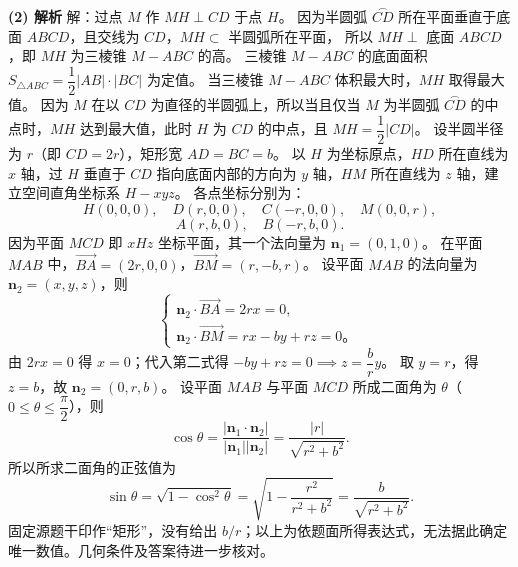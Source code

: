 \begin{answer}
\textbf{(2) 解析} 解：过点 $M$ 作 $MH \perp CD$ 于点 $H$。
因为半圆弧 $\overset{\frown}{CD}$ 所在平面垂直于底面 $ABCD$，且交线为 $CD$，$MH \subset$ 半圆弧所在平面，
所以 $MH \perp$ 底面 $ABCD$，即 $MH$ 为三棱锥 $M - ABC$ 的高。
三棱锥 $M - ABC$ 的底面面积 $S_{\triangle ABC} = \dfrac12 |AB| \cdot |BC|$ 为定值。
当三棱锥 $M - ABC$ 体积最大时，$MH$ 取得最大值。
因为 $M$ 在以 $CD$ 为直径的半圆弧上，所以当且仅当 $M$ 为半圆弧 $\overset{\frown}{CD}$ 的中点时，$MH$ 达到最大值，此时 $H$ 为 $CD$ 的中点，且 $MH = \dfrac12 |CD|$。
设半圆半径为 $r$（即 $CD = 2r$），矩形宽 $AD = BC = b$。
以 $H$ 为坐标原点，$HD$ 所在直线为 $x$ 轴，过 $H$ 垂直于 $CD$ 指向底面内部的方向为 $y$ 轴，$HM$ 所在直线为 $z$ 轴，建立空间直角坐标系 $H - xyz$。
各点坐标分别为：
\nopagebreak[4]
\[H(0, 0, 0), \quad D(r, 0, 0), \quad C(-r, 0, 0), \quad M(0, 0, r),\]
\nopagebreak[4]
\[A(r, b, 0), \quad B(-r, b, 0).\]
因为平面 $MCD$ 即 $xHz$ 坐标平面，其一个法向量为 $\boldsymbol n_1 = (0, 1, 0)$。
在平面 $MAB$ 中，$\overrightarrow{BA} = (2r, 0, 0)$，$\overrightarrow{BM} = (r, -b, r)$。
设平面 $MAB$ 的法向量为 $\boldsymbol n_2 = (x, y, z)$，则
\nopagebreak[4]
\[\begin{cases} \boldsymbol n_2 \cdot \overrightarrow{BA} = 2rx = 0, \\ \boldsymbol n_2 \cdot \overrightarrow{BM} = rx - by + rz = 0\mbox{。} \end{cases}\]
由 $2rx = 0$ 得 $x = 0$；代入第二式得 $-by + rz = 0 \implies z = \dfrac{b}{r} y$。
取 $y = r$，得 $z = b$，故 $\boldsymbol n_2 = (0, r, b)$。
设平面 $MAB$ 与平面 $MCD$ 所成二面角为 $\theta$（$0 \leqslant \theta \leqslant \dfrac\pi2$），则
\nopagebreak[4]
\[\cos\theta = \dfrac{|\boldsymbol n_1 \cdot \boldsymbol n_2|}{|\boldsymbol n_1||\boldsymbol n_2|} = \dfrac{|r|}{\sqrt{r^2 + b^2}}.\]
所以所求二面角的正弦值为
\nopagebreak[4]
\[\sin\theta = \sqrt{1 - \cos^2\theta} = \sqrt{1 - \dfrac{r^2}{r^2 + b^2}} = \dfrac{b}{\sqrt{r^2 + b^2}}.\]
固定源题干印作“矩形”，没有给出 $b/r$；以上为依题面所得表达式，无法据此确定唯一数值。几何条件及答案待进一步核对。



\end{answer}
